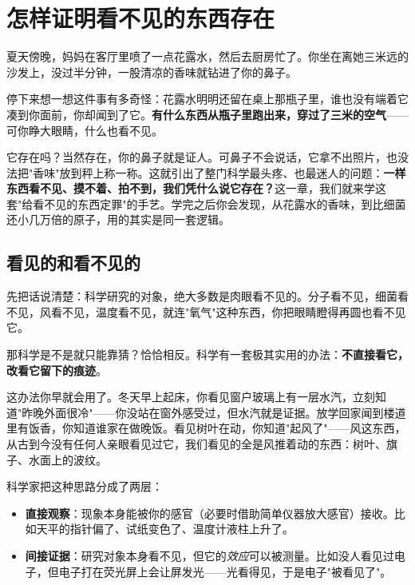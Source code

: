 \chapter{怎样证明看不见的东西存在}

\begin{kaichang}
夏天傍晚，妈妈在客厅里喷了一点花露水，然后去厨房忙了。你坐在离她三米远的沙发上，没过半分钟，一股清凉的香味就钻进了你的鼻子。

停下来想一想这件事有多奇怪：花露水明明还留在桌上那瓶子里，谁也没有端着它凑到你面前，你却闻到了它。\textbf{有什么东西从瓶子里跑出来，穿过了三米的空气}——可你睁大眼睛，什么也看不见。

它存在吗？当然存在，你的鼻子就是证人。可鼻子不会说话，它拿不出照片，也没法把"香味"放到秤上称一称。这就引出了整门科学最头疼、也最迷人的问题：\textbf{一样东西看不见、摸不着、拍不到，我们凭什么说它存在？}这一章，我们就来学这套"给看不见的东西定罪"的手艺。学完之后你会发现，从花露水的香味，到比细菌还小几万倍的原子，用的其实是同一套逻辑。
\end{kaichang}

\section{看见的和看不见的}

先把话说清楚：科学研究的对象，绝大多数是肉眼看不见的。分子看不见，细菌看不见，风看不见，温度看不见，就连"氧气"这种东西，你把眼睛瞪得再圆也看不见它。

那科学是不是就只能靠猜？恰恰相反。科学有一套极其实用的办法：\textbf{不直接看它，改看它留下的痕迹}。

这办法你早就会用了。冬天早上起床，你看见窗户玻璃上有一层水汽，立刻知道"昨晚外面很冷"——你没站在窗外感受过，但水汽就是证据。放学回家闻到楼道里有饭香，你知道谁家在做晚饭。看见树叶在动，你知道"起风了"——风这东西，从古到今没有任何人亲眼看见过它，我们看见的全是风推着动的东西：树叶、旗子、水面上的波纹。

科学家把这种思路分成了两层：

\begin{itemize}[itemsep=2pt]
\item \textbf{直接观察}：现象本身能被你的感官（必要时借助简单仪器放大感官）接收。比如天平的指针偏了、试纸变色了、温度计液柱上升了。
\item \textbf{间接证据}：研究对象本身看不见，但它的\emph{效应}可以被测量。比如没人看见过电子，但电子打在荧光屏上会让屏发光——光看得见，于是电子"被看见了"。
\end{itemize}

